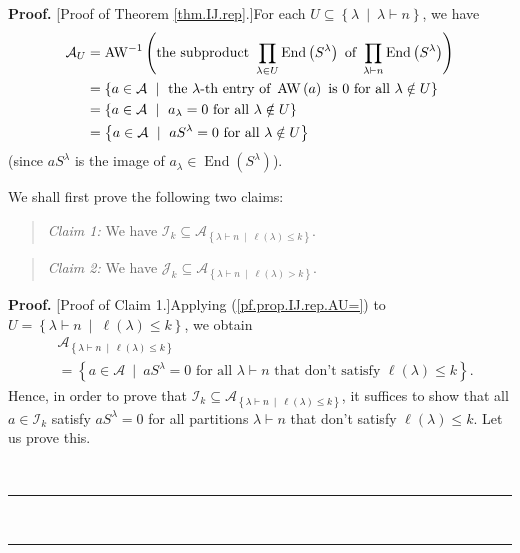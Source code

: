 \documentclass[numbers=enddot,12pt,final,onecolumn,notitlepage]{scrartcl}%
\numberwithin{exer}{subsection}
\theoremstyle{definition}
\newenvironment{statement}{\begin{quote}}{\end{quote}}
\newenvironment{proof}[1][Proof]{\noindent\textbf{#1.} }{\ \rule{0.5em}{0.5em}}
\let\prodnonlimits\prod
\renewcommand{\prod}{\prodnonlimits\limits}
\begin{document}
\begin{proof}
[Proof of Theorem \ref{thm.IJ.rep}.]For each $U\subseteq\left\{  \lambda
\ \mid\ \lambda\vdash n\right\}  $, we have
\begin{align}
\mathcal{A}_{U}  &  =\operatorname*{AW}\nolimits^{-1}\left(  \text{the
subproduct }\prod\limits_{\lambda\in U}\operatorname*{End}\left(  S^{\lambda
}\right)  \text{ of }\prod\limits_{\lambda\vdash n}\operatorname*{End}\left(
S^{\lambda}\right)  \right) \nonumber\\
&  =\left\{  a\in\mathcal{A}\ \mid\text{ the }\lambda\text{-th entry of
}\operatorname*{AW}\left(  a\right)  \text{ is }0\text{ for all }\lambda\notin
U\right\} \nonumber\\
&  =\left\{  a\in\mathcal{A}\ \mid\ a_{\lambda}=0\text{ for all }\lambda\notin
U\right\} \nonumber\\
&  =\left\{  a\in\mathcal{A}\ \mid\ aS^{\lambda}=0\text{ for all }%
\lambda\notin U\right\}  \label{pf.prop.IJ.rep.AU=}%
\end{align}
(since $aS^{\lambda}$ is the image of $a_{\lambda}\in\operatorname*{End}%
\left(  S^{\lambda}\right)  $).

We shall first prove the following two claims:

\begin{statement}
\textit{Claim 1:} We have $\mathcal{I}_{k}\subseteq\mathcal{A}_{\left\{
\lambda\vdash n\ \mid\ \ell\left(  \lambda\right)  \leq k\right\}  }$.
\end{statement}

\begin{statement}
\textit{Claim 2:} We have $\mathcal{J}_{k}\subseteq\mathcal{A}_{\left\{
\lambda\vdash n\ \mid\ \ell\left(  \lambda\right)  >k\right\}  }$.
\end{statement}

\begin{proof}
[Proof of Claim 1.]Applying (\ref{pf.prop.IJ.rep.AU=}) to $U=\left\{
\lambda\vdash n\ \mid\ \ell\left(  \lambda\right)  \leq k\right\}  $, we
obtain%
\begin{align*}
&  \mathcal{A}_{\left\{  \lambda\vdash n\ \mid\ \ell\left(  \lambda\right)
\leq k\right\}  }\\
&  =\left\{  a\in\mathcal{A}\ \mid\ aS^{\lambda}=0\text{ for all }%
\lambda\vdash n\text{ that don't satisfy }\ell\left(  \lambda\right)  \leq
k\right\}  .
\end{align*}
Hence, in order to prove that $\mathcal{I}_{k}\subseteq\mathcal{A}_{\left\{
\lambda\vdash n\ \mid\ \ell\left(  \lambda\right)  \leq k\right\}  }$, it
suffices to show that all $a\in\mathcal{I}_{k}$ satisfy $aS^{\lambda}=0$ for
all partitions $\lambda\vdash n$ that don't satisfy $\ell\left(
\lambda\right)  \leq k$. Let us prove this.


\end{proof}
\end{proof}
\end{document}
